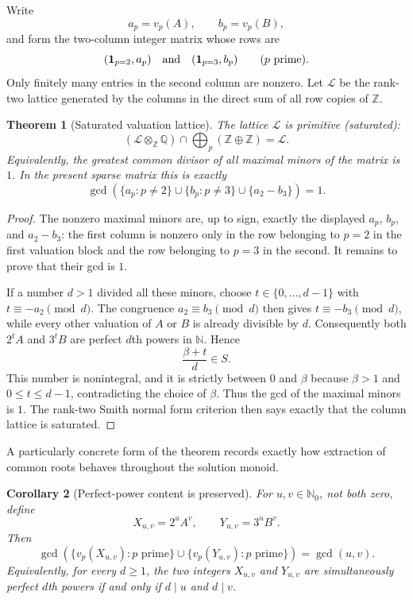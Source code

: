 \documentclass[11pt,oneside]{article}
\newtheorem{theorem}{Theorem}[section]
\newtheorem{corollary}[theorem]{Corollary}
\theoremstyle{definition}
\theoremstyle{remark}
\begin{document}
Write
\[
 a_p=v_p(A),\qquad b_p=v_p(B),
\]
and form the two-column integer matrix whose rows are
\[
  (\mathbf 1_{p=2},a_p)
  \quad\hbox{and}\quad
  (\mathbf 1_{p=3},b_p)
  \qquad (p\text{ prime}).
\]
Only finitely many entries in the second column are nonzero.  Let
$\mathcal L$ be the rank-two lattice generated by the columns in the direct
sum of all row copies of $\mathbb Z$.

\begin{theorem}[Saturated valuation lattice]
\label{thm:saturated-valuation-lattice}
The lattice $\mathcal L$ is primitive (saturated):
\[
  (\mathcal L\otimes_{\mathbb Z}\mathbb Q)
  \cap\bigoplus_p(\mathbb Z\oplus\mathbb Z)=\mathcal L.
\]
Equivalently, the greatest common divisor of all maximal minors of the matrix
is $1$.  In the present sparse matrix this is exactly
\[
 \gcd\!\left(
   \{a_p:p\ne2\}\cup
   \{b_p:p\ne3\}\cup
   \{a_2-b_3\}
 \right)=1.
\]
\end{theorem}

\begin{proof}
The nonzero maximal minors are, up to sign, exactly the displayed $a_p$,
$b_p$, and $a_2-b_3$: the first column is nonzero only in the row belonging to
$p=2$ in the first valuation block and the row belonging to $p=3$ in the
second.  It remains to prove that their gcd is $1$.

If a number $d>1$ divided all these minors, choose
$t\in\{0,\ldots,d-1\}$ with $t\equiv-a_2\pmod d$.  The congruence
$a_2\equiv b_3\pmod d$ then gives $t\equiv-b_3\pmod d$, while every other
valuation of $A$ or $B$ is already divisible by $d$.  Consequently both
$2^tA$ and $3^tB$ are perfect $d$th powers in $\mathbb N$.  Hence
\[
  \frac{\beta+t}{d}\in S.
\]
This number is nonintegral, and it is strictly between $0$ and $\beta$ because
$\beta>1$ and $0\le t\le d-1$, contradicting the choice of $\beta$.  Thus the
gcd of the maximal minors is $1$.  The rank-two Smith normal form criterion
then says exactly that the column lattice is saturated.
\end{proof}

A particularly concrete form of the theorem records exactly how extraction of
common roots behaves throughout the solution monoid.

\begin{corollary}[Perfect-power content is preserved]
\label{cor:perfect-power-content}
For $u,v\in\mathbb N_0$, not both zero, define
\[
 X_{u,v}=2^uA^v,\qquad Y_{u,v}=3^uB^v.
\]
Then
\[
 \gcd\!\left(
   \{v_p(X_{u,v}):p\text{ prime}\}
   \cup
   \{v_p(Y_{u,v}):p\text{ prime}\}
 \right)=\gcd(u,v).
\]
Equivalently, for every $d\ge1$, the two integers $X_{u,v}$ and $Y_{u,v}$
are simultaneously perfect $d$th powers if and only if
$d\mid u$ and $d\mid v$.
\end{corollary}
\end{document}
